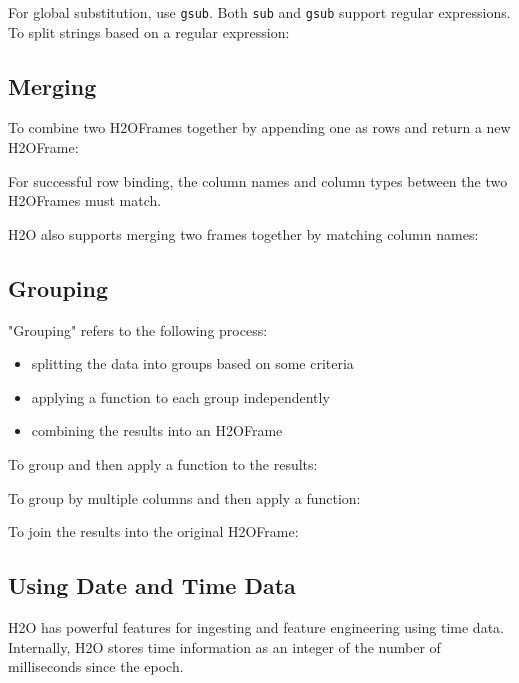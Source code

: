{For global substitution, use {\texttt{gsub}}.  Both {\texttt{sub}} and {\texttt{gsub}} support regular expressions. To split strings based on a regular expression:



\subsection{Merging}
To combine two H2OFrames together by appending one as rows and return a new H2OFrame:


For successful row binding, the column names and column types between the two H2OFrames must match.

H2O also supports merging two frames together by matching column names:


\newpage

\subsection{Grouping}

"Grouping" refers to the following process:

\begin{itemize}
\item splitting the data into groups based on some criteria 
\item applying a function to each group independently
\item combining the results into an H2OFrame
\end{itemize}

To group and then apply a function to the results:


To group by multiple columns and then apply a function:


\newpage

To join the results into the original H2OFrame:


\subsection{Using Date and Time Data} 
H2O has powerful features for ingesting and feature engineering using time data.  Internally, H2O
stores time information as an integer of the number of milliseconds since the epoch.

}
